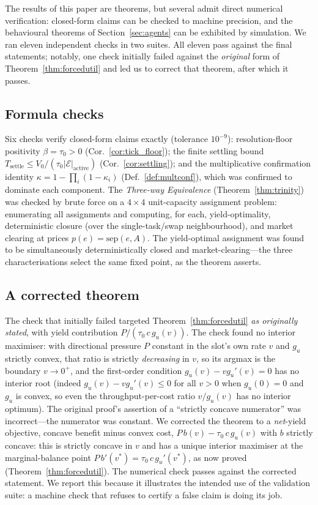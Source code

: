 \documentclass[11pt,twocolumn,a4paper]{article}
\theoremstyle{plain}
\theoremstyle{definition}
\theoremstyle{remark}
\newcommand{\E}{\mathcal{E}}
\newcommand{\tick}{\tau_0}
\newcommand{\sep}{\mathrm{sep}}
\newcommand{\floor}{\beta}
\newcommand{\kap}{\kappa}
\newcommand{\pres}{P}
\begin{document}
The results of this paper are theorems, but several admit direct
numerical verification: closed-form claims can be checked to machine
precision, and the behavioural theorems of Section~\ref{sec:agents} can
be exhibited by simulation. We ran eleven independent checks in two
suites. All eleven pass against the final statements; notably, one check
initially failed against the \emph{original} form of
Theorem~\ref{thm:forcedutil} and led us to correct that theorem, after
which it passes.

\subsection{Formula checks}

Six checks verify closed-form claims exactly (tolerance $10^{-9}$):
resolution-floor positivity $\floor=\tick>0$
(Cor.~\ref{cor:tick_floor}); the finite settling bound
$T_{\mathrm{settle}}\le V_0/(\tick|\E|_{\mathrm{active}})$
(Cor.~\ref{cor:settling}); and the multiplicative confirmation identity
$\kap=1-\prod_i(1-\kap_i)$ (Def.~\ref{def:multconf}), which was
confirmed to dominate each component. The \emph{Three-way Equivalence}
(Theorem~\ref{thm:trinity}) was checked by brute force on a
$4{\times}4$ unit-capacity assignment problem: enumerating all
assignments and computing, for each, yield-optimality, deterministic
closure (over the single-task/swap neighbourhood), and market clearing
at prices $p(e)=\sep(e,A)$. The yield-optimal assignment was found to be
simultaneously deterministically closed and market-clearing---the three
characterisations select the same fixed point, as the theorem asserts.

\subsection{A corrected theorem}

The check that initially failed targeted Theorem~\ref{thm:forcedutil}
\emph{as originally stated}, with yield contribution
$\pres/(\tick\,c\,g_u(v))$.
The check found no interior maximiser: with directional pressure
$\pres$ constant in the slot's own rate $v$ and $g_u$ strictly convex,
that ratio is strictly \emph{decreasing} in $v$, so its argmax is the
boundary $v\to 0^+$, and the first-order condition
$g_u(v)-v g_u'(v)=0$ has no interior root (indeed
$g_u(v)-v g_u'(v)\le 0$ for all $v>0$ when $g_u(0)=0$ and $g_u$ is
convex, so even the throughput-per-cost ratio $v/g_u(v)$ has no interior
optimum). The original proof's assertion of a ``strictly concave
numerator'' was incorrect---the numerator was constant. We corrected the
theorem to a \emph{net}-yield objective, concave benefit minus convex
cost, $\pres\,b(v)-\tick\,c\,g_u(v)$ with $b$ strictly concave: this is
strictly concave in $v$ and has a unique interior maximiser at the
marginal-balance point $\pres\,b'(v^*)=\tick\,c\,g_u'(v^*)$, as now
proved (Theorem~\ref{thm:forcedutil}). The numerical check passes
against the corrected statement. We report this because it illustrates
the intended use of the validation suite: a machine check that refuses
to certify a false claim is doing its job.
\end{document}

